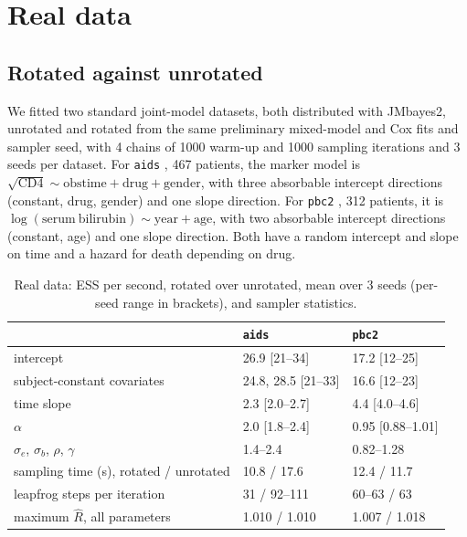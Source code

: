 \section{Real data}\label{sec:realdata}

\subsection{Rotated against unrotated}

We fitted two standard joint-model datasets, both distributed with
JMbayes2, unrotated and rotated from the same preliminary mixed-model and
Cox fits and sampler seed, with 4 chains of 1000 warm-up and 1000 sampling
iterations and 3 seeds per dataset. For \texttt{aids}
\citep{abrams1994,guo2004}, 467 patients, the marker model is
$\sqrt{\mathrm{CD4}} \sim \mathrm{obstime} + \mathrm{drug} +
\mathrm{gender}$, with three absorbable intercept directions (constant,
drug, gender) and one slope direction. For \texttt{pbc2}
\citep{murtaugh1994}, 312 patients, it is $\log(\mathrm{serum\
bilirubin}) \sim \mathrm{year} + \mathrm{age}$, with two absorbable
intercept directions (constant, age) and one slope direction. Both have a
random intercept and slope on time and a hazard for death depending on
drug.

\begin{table}[t]
\centering
\caption{Real data: ESS per second, rotated over unrotated, mean over 3
seeds (per-seed range in brackets), and sampler statistics.}
\label{tab:real}
\small
\begin{tabular}{lll}
\toprule
& \texttt{aids} & \texttt{pbc2} \\
\midrule
intercept & 26.9 [21--34] & 17.2 [12--25] \\
subject-constant covariates & 24.8, 28.5 [21--33] & 16.6 [12--23] \\
time slope & 2.3 [2.0--2.7] & 4.4 [4.0--4.6] \\
$\alpha$ & 2.0 [1.8--2.4] & 0.95 [0.88--1.01] \\
$\sigma_e$, $\sigma_b$, $\rho$, $\gamma$ & 1.4--2.4 & 0.82--1.28 \\
sampling time (s), rotated / unrotated & 10.8 / 17.6 & 12.4 / 11.7 \\
leapfrog steps per iteration & 31 / 92--111 & 60--63 / 63 \\
maximum $\hat R$, all parameters & 1.010 / 1.010 & 1.007 / 1.018 \\
\bottomrule
\end{tabular}
\end{table}


